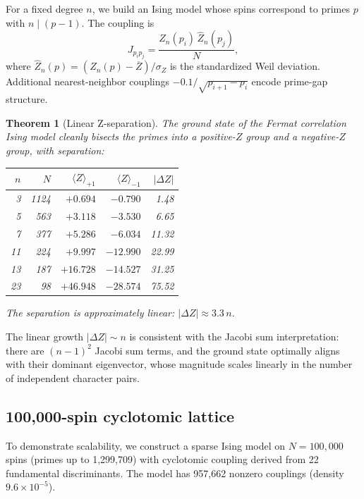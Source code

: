 \documentclass[11pt]{amsart}
\newtheorem{theorem}{Theorem}[section]
\theoremstyle{definition}
\begin{document}
For a fixed degree $n$, we build an Ising model whose spins correspond to primes $p$ with $n \mid (p-1)$. The coupling is
\[
J_{p_i p_j} = \frac{\hat{Z}_n(p_i)\, \hat{Z}_n(p_j)}{N},
\]
where $\hat{Z}_n(p) = (Z_n(p) - \overline{Z})/\sigma_Z$ is the standardized Weil deviation. Additional nearest-neighbor couplings $-0.1/\sqrt{p_{i+1} - p_i}$ encode prime-gap structure.

\begin{theorem}[Linear Z-separation]\label{thm:zsep}
The ground state of the Fermat correlation Ising model cleanly bisects the primes into a positive-$Z$ group and a negative-$Z$ group, with separation:

\begin{center}
\begin{tabular}{r r r r r}
\toprule
$n$ & $N$ & $\langle Z \rangle_{+1}$ & $\langle Z \rangle_{-1}$ & $|\Delta Z|$ \\
\midrule
3 & 1124 & $+0.694$ & $-0.790$ & 1.48 \\
5 & 563 & $+3.118$ & $-3.530$ & 6.65 \\
7 & 377 & $+5.286$ & $-6.034$ & 11.32 \\
11 & 224 & $+9.997$ & $-12.990$ & 22.99 \\
13 & 187 & $+16.728$ & $-14.527$ & 31.25 \\
23 & 98 & $+46.948$ & $-28.574$ & 75.52 \\
\bottomrule
\end{tabular}
\end{center}

The separation is approximately linear: $|\Delta Z| \approx 3.3\, n$.
\end{theorem}

The linear growth $|\Delta Z| \sim n$ is consistent with the Jacobi sum interpretation: there are $(n-1)^2$ Jacobi sum terms, and the ground state optimally aligns with their dominant eigenvector, whose magnitude scales linearly in the number of independent character pairs.


\subsection{100{,}000-spin cyclotomic lattice}
\label{sec:100k}

To demonstrate scalability, we construct a sparse Ising model on $N = 100{,}000$ spins (primes up to 1{,}299{,}709) with cyclotomic coupling derived from 22 fundamental discriminants. The model has 957{,}662 nonzero couplings (density $9.6 \times 10^{-5}$).
\end{document}
